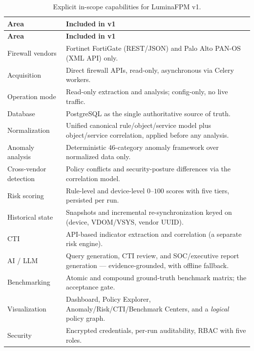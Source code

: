 \documentclass[12pt,a4paper]{report}
\renewcommand{\_}{\textunderscore\allowbreak}
\newcommand{\hcell}[1]{\textbf{#1}}
\begin{document}
\begin{longtable}{L{0.34\textwidth} L{0.60\textwidth}}
\caption{Explicit in-scope capabilities for LuminaFPM v1.}\label{tab:ch1-scope-in}\\
\hline
\hcell{Area} & \hcell{Included in v1} \\ \hline
\endfirsthead
\hline
\hcell{Area} & \hcell{Included in v1} \\ \hline
\endhead
Firewall vendors & Fortinet FortiGate (REST/JSON) and Palo Alto PAN-OS (XML API) only. \\
Acquisition & Direct firewall APIs, read-only, asynchronous via Celery workers. \\
Operation mode & Read-only extraction and analysis; config-only, no live traffic. \\
Database & PostgreSQL as the single authoritative source of truth. \\
Normalization & Unified canonical rule/object/service model plus object/service correlation, applied before any analysis. \\
Anomaly analysis & Deterministic 46-category anomaly framework over normalized data only. \\
Cross-vendor detection & Policy conflicts and security-posture differences via the correlation model. \\
Risk scoring & Rule-level and device-level $0$--$100$ scores with five tiers, persisted per run. \\
Historical state & Snapshots and incremental re-synchronization keyed on (device, VDOM/VSYS, vendor UUID). \\
CTI & API-based indicator extraction and correlation (a separate risk engine). \\
AI / LLM & Query generation, CTI review, and SOC/executive report generation --- evidence-grounded, with offline fallback. \\
Benchmarking & Atomic and compound ground-truth benchmark matrix; the acceptance gate. \\
Visualization & Dashboard, Policy Explorer, Anomaly/Risk/CTI/Benchmark Centers, and a \emph{logical} policy graph. \\
Security & Encrypted credentials, per-run auditability, RBAC with five roles. \\ \hline
\end{longtable}
\end{document}

